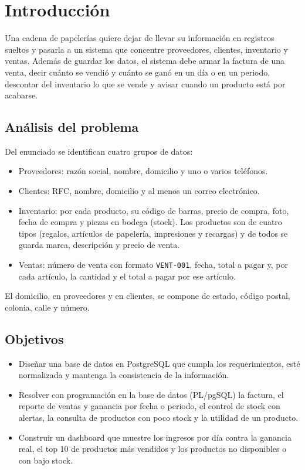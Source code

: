 \documentclass[12pt,a4paper]{article}
\newcommand{\cod}[1]{{\ttfamily\nolinkurl{#1}}}
\begin{document}
\setcounter{tocdepth}{2}
\tableofcontents
\newpage

\section{Introducción}

Una cadena de papelerías quiere dejar de llevar su información en registros
sueltos y pasarla a un sistema que concentre proveedores, clientes, inventario y
ventas. Además de guardar los datos, el sistema debe armar la factura de una
venta, decir cuánto se vendió y cuánto se ganó en un día o en un periodo,
descontar del inventario lo que se vende y avisar cuando un producto está por
acabarse.

\subsection{Análisis del problema}

Del enunciado se identifican cuatro grupos de datos:

\begin{itemize}[leftmargin=1.2cm, itemsep=0.2em]
\item Proveedores: razón social, nombre, domicilio y uno o varios teléfonos.
\item Clientes: RFC, nombre, domicilio y al menos un correo electrónico.
\item Inventario: por cada producto, su código de barras, precio de compra, foto,
fecha de compra y piezas en bodega (stock). Los productos son de cuatro tipos
(regalos, artículos de papelería, impresiones y recargas) y de todos se guarda
marca, descripción y precio de venta.
\item Ventas: número de venta con formato \cod{VENT-001}, fecha, total a pagar y,
por cada artículo, la cantidad y el total a pagar por ese artículo.
\end{itemize}

El domicilio, en proveedores y en clientes, se compone de estado, código postal,
colonia, calle y número.

\subsection{Objetivos}

\begin{itemize}[leftmargin=1.2cm, itemsep=0.2em]
\item Diseñar una base de datos en PostgreSQL que cumpla los requerimientos, esté
normalizada y mantenga la consistencia de la información.
\item Resolver con programación en la base de datos (PL/pgSQL) la factura, el
reporte de ventas y ganancia por fecha o periodo, el control de stock con alertas,
la consulta de productos con poco stock y la utilidad de un producto.
\item Construir un dashboard que muestre los ingresos por día contra la ganancia
real, el top 10 de productos más vendidos y los productos no disponibles o con
bajo stock.
\end{itemize}
\end{document}
